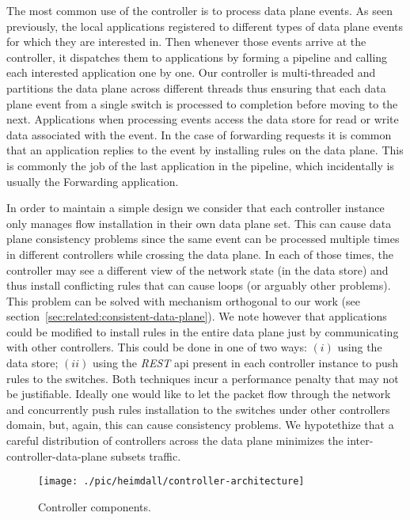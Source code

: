 The most common use of the controller is to process data plane events. As seen previously, the local applications registered to different types of data plane events for which they are interested in. Then whenever those events arrive at the controller, it dispatches them to applications by forming a pipeline and calling each interested application one by one. Our controller is multi-threaded and partitions the data plane across different threads thus ensuring  that each data plane event from a single switch is processed to completion before moving to the next. 
Applications when processing events access the data store for read or write data associated with the event. In the case of forwarding requests it is common that an application replies to the event by installing rules on the data plane. This is commonly the job of the last application in the pipeline, which incidentally is usually the Forwarding application.

In order to maintain a simple design we consider that each controller instance only manages flow installation in their own data plane set. 
This can cause data plane consistency problems since the same event can be processed multiple times in different controllers while crossing the data plane. In each of those times, the controller may see a different view of the network state (in the data store) and thus install conflicting rules that can cause loops (or arguably other problems). This problem can be solved with mechanism orthogonal to our work (see section~\ref{sec:related:consistent-data-plane}). We note however that applications could be modified to install rules in the entire data plane just by communicating with other controllers. This could be done in one of two ways: $(i)$ using the data store; $(ii)$ using the \emph{REST} \gls{api} present in each controller instance to push rules to the switches.  Both techniques incur a performance penalty that may not be justifiable. Ideally one would like to let the packet flow through the network and concurrently push rules installation to the switches under other controllers domain, but, again, this can cause consistency problems. 
We hypotethize that a careful distribution of controllers across the data plane minimizes the inter-controller-data-plane subsets traffic. 


\begin{figure}
  \centering
  \texttt{[image: ./pic/heimdall/controller-architecture]}
  \caption{Controller components. }
  \label{fig:heimdall:architecture}
\end{figure}


